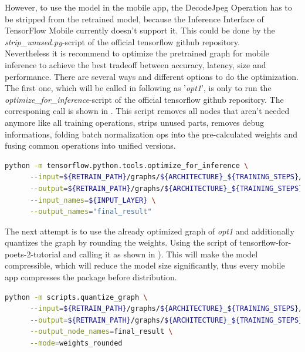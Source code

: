 However, to use the model in the mobile app, the DecodeJpeg Operation has to be stripped from the retrained model, because the Inference Interface of TensorFlow Mobile currently doesn't support it. This could be done by the \textit{strip_unused.py}-script of the official tensorflow github repository. \\

Nevertheless it is recommend to optimize the pretrained graph for mobile inference to achieve the best tradeoff between accuracy, latency, size and performance. There are several ways and different options to do the optimization. \\

The first one, which will be called in following as '\textit{opt1}', is only to run the \textit{optimize_for_inference}-script of the official tensorflow github repository. The corresponing call is shown in .
This script removes all nodes that aren't needed anymore like all training operations, strips unused parts, removes debug informations, folding batch normalization ops into the pre-calculated weights and fusing common operations into unified versions.
 
\begin{minipage}{\linewidth}
\begin{lstlisting}[caption=Call of \textit{optimize_for_inference.py}, label=list:optimize_graph, language=bash]
	python -m tensorflow.python.tools.optimize_for_inference \
	  --input=${RETRAIN_PATH}/graphs/${ARCHITECTURE}_${TRAINING_STEPS}/retrained_dog_graph_${ARCHITECTURE}_${TRAINING_STEPS}_${LEARNING_RATE}.pb \
	  --output=${RETRAIN_PATH}/graphs/${ARCHITECTURE}_${TRAINING_STEPS}/opt1_retrained_dog_graph_${ARCHITECTURE}_${TRAINING_STEPS}_${LEARNING_RATE}.pb \
	  --input_names=${INPUT_LAYER} \
	  --output_names="final_result"
\end{lstlisting}
\end{minipage}

The next attempt is to use the already optimized graph of \textit{opt1} and additionally quantizes the graph by rounding the weights. Using the script of tensorflow-for-poets-2-tutorial and calling it as shown in ). This will make the model compressible, which will reduce the model size significantly, thus every mobile app compresses the package before distribution.

\begin{minipage}{\linewidth}
\begin{lstlisting}[caption=Call of \textit{quantize_graph.py}, label=list:quantize_graph, language=bash]
	python -m scripts.quantize_graph \
	  --input=${RETRAIN_PATH}/graphs/${ARCHITECTURE}_${TRAINING_STEPS}/opt1_retrained_dog_graph_${ARCHITECTURE}_${TRAINING_STEPS}_${LEARNING_RATE}.pb \
	  --output=${RETRAIN_PATH}/graphs/${ARCHITECTURE}_${TRAINING_STEPS}/opt2_retrained_dog_graph_${ARCHITECTURE}_${TRAINING_STEPS}_${LEARNING_RATE}.pb \
	  --output_node_names=final_result \
	  --mode=weights_rounded
\end{lstlisting}
\end{minipage}

